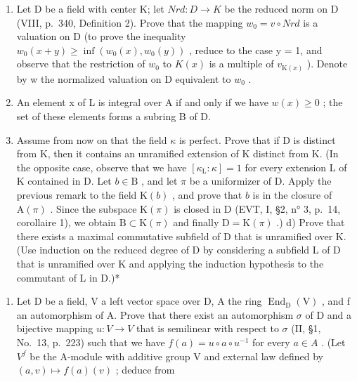 \begin{enumerate}
\def\labelenumi{\alph{enumi})}
\item
  Let D be a field with center K; let \(Nrd : D \to K\) be the reduced norm on D (VIII, p.~340, Definition 2). Prove that the mapping \(w_{0} = v \circ Nrd\) is a valuation on D (to prove the inequality \(w_{0}(x + y) \geqslant \inf(w_{0}(x), w_{0}(y))\) , reduce to the case y = 1, and observe that the restriction of \(w_{0}\) to \(K(x)\) is a multiple of \(v_{\mathrm{K}(x)}\) ). Denote by w the normalized valuation on D equivalent to \(w_{0}\) .
\item
  An element x of L is integral over A if and only if we have \(w(x) \geqslant 0\) ; the set of these elements forms a subring B of D.
\item
  Assume from now on that the field \(\kappa\) is perfect. Prove that if D is distinct from K, then it contains an unramified extension of K distinct from K. (In the opposite case, observe that we have \([\kappa_{\mathrm{L}}:\kappa] = 1\) for every extension L of K contained in D. Let \(b\in \mathrm{B}\) , and let \(\pi\) be a uniformizer of D. Apply the previous remark to the field \(\mathrm{K}(b)\) , and prove that \(b\) is in the closure of \(\mathrm{A}(\pi)\) . Since the subspace \(\mathrm{K}(\pi)\) is closed in D (EVT, I, §2, n° 3, p.~14, corollaire 1), we obtain \(\mathrm{B}\subset \mathrm{K}(\pi)\) and finally \(\mathrm{D} = \mathrm{K}(\pi)\) .) d) Prove that there exists a maximal commutative subfield of D that is unramified over K. (Use induction on the reduced degree of D by considering a subfield L of D that is unramified over K and applying the induction hypothesis to the commutant of L in D.)*
\end{enumerate}

\begin{enumerate}
\def\labelenumi{\arabic{enumi})}
\setcounter{enumi}{12}
\tightlist
\item
  Let D be a field, V a left vector space over D, A the ring \(\operatorname{End}_{\mathrm{D}}(\mathrm{V})\) , and f an automorphism of A. Prove that there exist an automorphism \(\sigma\) of D and a bijective mapping \(u: V \to V\) that is semilinear with respect to \(\sigma\) (II, §1, No.~13, p.~223) such that we have \(f(a) = u \circ a \circ u^{-1}\) for every \(a \in A\) . (Let \(V^{f}\) be the A-module with additive group V and external law defined by \((a, v) \mapsto f(a)(v)\) ; deduce from
\end{enumerate}

